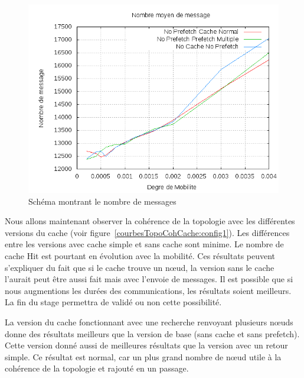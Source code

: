 	\begin{figure}[!h]
        \centering
        \includegraphics[scale=0.5]{../CacheCode/SolipsisPeersim/resultats/Courbes/Courbes_Final_Rapport/Nombre_Messages_Caches.png}
        \caption{Schéma montrant le nombre de messages}
        \label{courbesNbMessCache:config1}
        \end{figure}

Nous allons maintenant observer la cohérence de la topologie avec les différentes versions du cache (voir figure~\ref{courbesTopoCohCache:config1}). Les différences entre les versions avec cache simple et sans cache sont minime. Le nombre de cache Hit est pourtant en évolution avec la mobilité. Ces résultats peuvent s'expliquer du fait que si le cache trouve un nœud, la version sans le cache l'aurait peut être aussi fait mais avec l'envoie de messages. Il est possible que si nous augmentions les durées des communications, les résultats soient meilleurs. La fin du stage permettra de validé ou non cette possibilité.
\par La version du cache fonctionnant avec une recherche renvoyant plusieurs nœuds donne des résultats meilleurs que la version de base (sans cache et sans prefetch). Cette version donné aussi de meilleures résultats que la version avec un retour simple. Ce résultat est normal, car un plus grand nombre de nœud utile à la cohérence de la topologie et rajouté en un passage.

